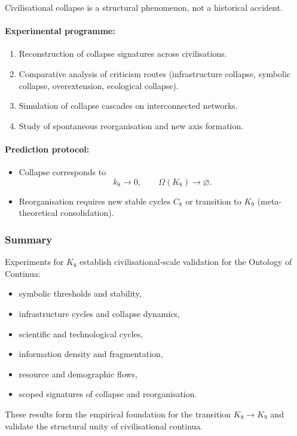Civilisational collapse is a structural phenomenon, not a historical accident.

\paragraph{Experimental programme:}

\begin{enumerate}
    \item Reconstruction of collapse signatures across civilisations.
    \item Comparative analysis of criticism routes 
          (infrastructure collapse, symbolic collapse,
           overextension, ecological collapse).
    \item Simulation of collapse cascades on interconnected networks.
    \item Study of spontaneous reorganisation and new axis formation.
\end{enumerate}

\paragraph{Prediction protocol:}

\begin{itemize}
    \item Collapse corresponds to 
          \[
             k_8 \rightarrow 0,\qquad \Omega(K_8) \rightarrow \varnothing.
          \]
    \item Reorganisation requires new stable cycles $C_8$ 
          or transition to $K_9$ (meta-theoretical consolidation).
\end{itemize}



\subsubsection{Summary}

Experiments for $K_8$ establish civilisational-scale validation for the Ontology of Continua:

\begin{itemize}
    \item symbolic thresholds and stability,
    \item infrastructure cycles and collapse dynamics,
    \item scientific and technological cycles,
    \item information density and fragmentation,
    \item resource and demographic flows,
    \item scoped signatures of collapse and reorganisation.
\end{itemize}

These results form the empirical foundation for the transition $K_8 \rightarrow K_9$
and validate the structural unity of civilisational continua.
